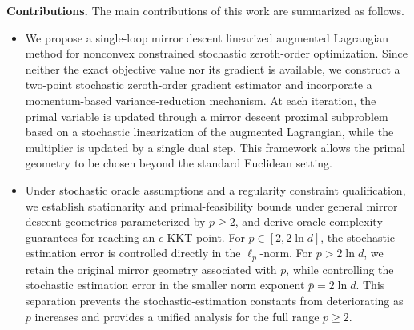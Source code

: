 \documentclass[11pt]{article}
\numberwithin{equation}{section}
\begin{document}
{\bf Contributions.} 
The main contributions of this work are summarized as follows.
\begin{itemize}
\item
We propose a single-loop mirror descent linearized augmented Lagrangian method for nonconvex constrained stochastic zeroth-order optimization. 
Since neither the exact objective value nor its gradient is available, we construct a two-point stochastic zeroth-order gradient estimator and incorporate a momentum-based variance-reduction mechanism. 
At each iteration, the primal variable is updated through a mirror descent proximal subproblem based on a stochastic linearization of the augmented Lagrangian, while the multiplier is updated by a single dual step. 
This framework allows the primal geometry to be chosen beyond the standard Euclidean setting.

\item
Under stochastic oracle assumptions and a regularity  constraint qualification, we establish stationarity and primal-feasibility bounds under general mirror descent geometries parameterized by $p\geq 2$, and derive oracle complexity guarantees for reaching an $\epsilon$-KKT point.
For $p\in[2,2\ln d]$, the stochastic estimation error is controlled directly in the $\ell_p$-norm.
For $p>2\ln d$, we retain the original mirror geometry associated with $p$, while controlling the stochastic estimation error in the smaller norm exponent
$\bar p=2\ln d$.
This separation prevents the stochastic-estimation constants from deteriorating as $p$ increases and provides a unified analysis for the full range $p\geq2$.


\end{itemize}
\end{document}
